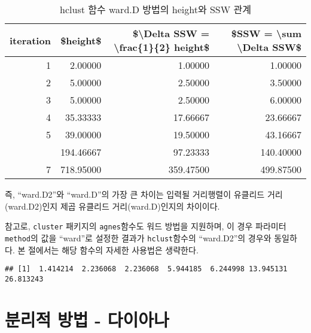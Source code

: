 \documentclass[
]{book}
\newenvironment{Shaded}{\begin{snugshade}}{\end{snugshade}}
\newcommand{\AttributeTok}[1]{\textcolor[rgb]{0.77,0.63,0.00}{#1}}
\newcommand{\DecValTok}[1]{\textcolor[rgb]{0.00,0.00,0.81}{#1}}
\newcommand{\FunctionTok}[1]{\textcolor[rgb]{0.00,0.00,0.00}{#1}}
\newcommand{\NormalTok}[1]{#1}
\newcommand{\OtherTok}[1]{\textcolor[rgb]{0.56,0.35,0.01}{#1}}
\newcommand{\SpecialCharTok}[1]{\textcolor[rgb]{0.00,0.00,0.00}{#1}}
\newcommand{\StringTok}[1]{\textcolor[rgb]{0.31,0.60,0.02}{#1}}
\begin{document}
\begin{table}

\caption{\label{tab:ward-D-height-ssw}hclust 함수 ward.D 방법의 height와 SSW 관계}
\centering
\begin{tabular}[t]{rrrr}
\toprule
iteration & \$height\$ & \$\textbackslash{}Delta SSW = \textbackslash{}frac\{1\}\{2\} height\$ & \$SSW = \textbackslash{}sum \textbackslash{}Delta SSW\$\\
\midrule
1 & 2.00000 & 1.00000 & 1.00000\\
2 & 5.00000 & 2.50000 & 3.50000\\
3 & 5.00000 & 2.50000 & 6.00000\\
4 & 35.33333 & 17.66667 & 23.66667\\
5 & 39.00000 & 19.50000 & 43.16667\\
\addlinespace
6 & 194.46667 & 97.23333 & 140.40000\\
7 & 718.95000 & 359.47500 & 499.87500\\
\bottomrule
\end{tabular}
\end{table}

즉, ``ward.D2''와 ``ward.D''의 가장 큰 차이는 입력될 거리행렬이 유클리드 거리(ward.D2)인지 제곱 유클리드 거리(ward.D)인지의 차이이다.

참고로, \texttt{cluster} 패키지의 \texttt{agnes}함수도 워드 방법을 지원하며, 이 경우 파라미터 \texttt{method}의 값을 ``ward''로 설정한 결과가 \texttt{hclust}함수의 ``ward.D2''의 경우와 동일하다. 본 절에서는 해당 함수의 자세한 사용법은 생략한다.

\begin{Shaded}
\end{Shaded}

\begin{verbatim}
## [1]  1.414214  2.236068  2.236068  5.944185  6.244998 13.945131 26.813243
\end{verbatim}

\hypertarget{diana}{%
\section{분리적 방법 - 다이아나}\label{diana}}
\end{document}
